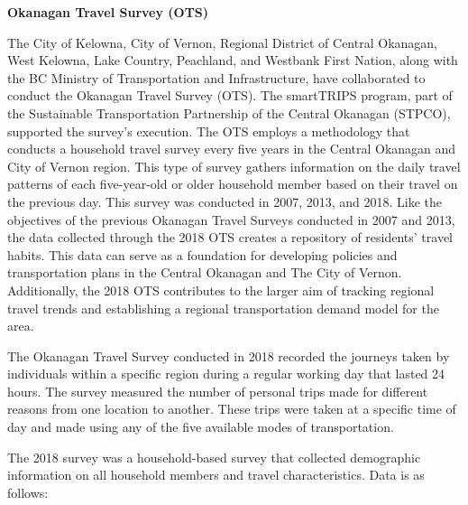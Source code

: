 \documentclass[
11pt, %
oneside, %
english, %
singlespacing, %
]{macthesis} %
\begin{document}
\textbf{Okanagan Travel Survey (OTS)}

The City of Kelowna, City of Vernon, Regional District of Central Okanagan, West Kelowna, Lake Country, Peachland, and Westbank First Nation, along with the BC Ministry of Transportation and Infrastructure, have collaborated to conduct the Okanagan Travel Survey (OTS). The smartTRIPS program, part of the Sustainable Transportation Partnership of the Central Okanagan (STPCO), supported the survey's execution. The OTS employs a methodology that conducts a household travel survey every five years in the Central Okanagan and City of Vernon region. This type of survey gathers information on the daily travel patterns of each five-year-old or older household member based on their travel on the previous day. This survey was conducted in 2007, 2013, and 2018. Like the objectives of the previous Okanagan Travel Surveys conducted in 2007 and 2013, the data collected through the 2018 OTS creates a repository of residents' travel habits. This data can serve as a foundation for developing policies and transportation plans in the Central Okanagan and The City of Vernon. Additionally, the 2018 OTS contributes to the larger aim of tracking regional travel trends and establishing a regional transportation demand model for the area.

The Okanagan Travel Survey conducted in 2018 recorded the journeys taken by individuals within a specific region during a regular working day that lasted 24 hours. The survey measured the number of personal trips made for different reasons from one location to another. These trips were taken at a specific time of day and made using any of the five available modes of transportation.

The 2018 survey was a household-based survey that collected demographic information on all household members and travel characteristics. Data is as follows:
\end{document}
